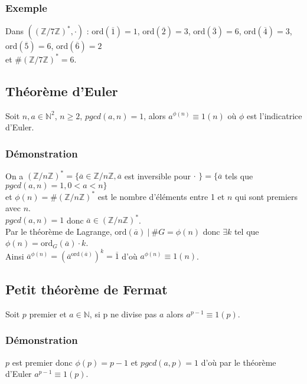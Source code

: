 \documentclass[a4paper,10pt]{book} %
\newcommand{\N}{\mathbb{N}}
\newcommand{\Z}{\mathbb{Z}}
\newcommand{\ord}{\mathrm{ord}}
\begin{document}
\subsubsection{Exemple}
Dans $((\Z/7\Z)^*,\cdot)$ : $\ord(\overline{1})=1$, $\ord(\overline{2})=3$, $\ord(\overline{3})=6$, $\ord(\overline{4})=3$, $\ord(\overline{5})=6$, $\ord(\overline{6})=2$\\ et $\# (\Z/7\Z)^*=6$.

\subsection{Théorème d'Euler}
Soit $n,a\in \N^2$, $n\geq 2$, $pgcd(a,n)=1$, alors $a^{\phi(n)}\equiv 1(n)$ où $\phi$ est l'indicatrice d'Euler.

\subsubsection{Démonstration}
On a $(\Z/n\Z)^*=\{\overline{a}\in \Z/n\Z, \overline{a}$ est inversible pour $\cdot$ $\}=\{\overline{a}$ tels que $pgcd(a,n)=1, 0<a<n\}$\\
et $\phi(n)=\# (\Z/n\Z)^*$ est le nombre d'éléments entre 1 et $n$ qui sont premiers avec $n$.\\

$pgcd(a,n)=1$ donc $\overline{a}\in (\Z/n\Z)^*$.\\
Par le théorème de Lagrange, $\ord(\overline{a}) ~|~\# G=\phi(n)$ donc $\exists k$ tel que $\phi(n)=\ord_G(\overline{a})\cdot k$.\\

Ainsi $\overline{a}^{\phi(n)}=(\overline{a}^{\ord(\overline{a})})^k =\overline{1}$ d'où $a^{\phi(n)}\equiv 1(n)$.

\subsection{Petit théorème de Fermat}
Soit $p$ premier et $a\in \N$, si p ne divise pas $a$ alors $a^{p-1}\equiv 1(p)$.

\subsubsection{Démonstration}
$p$ est premier donc $\phi(p)=p-1$ et $pgcd(a,p)=1$ d'où par le théorème d'Euler $a^{p-1}\equiv 1(p)$.
\end{document}
